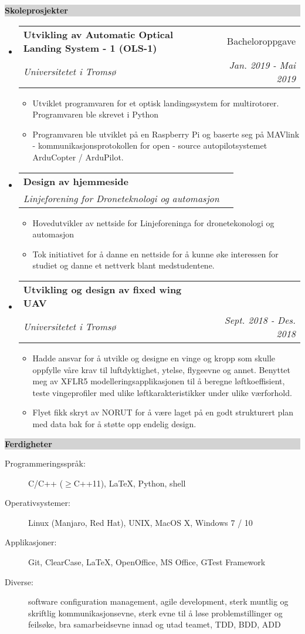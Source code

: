 \documentclass[letterpaper,11pt]{article}
\makeatletter
\newcommand{\mycolorbox}[2]{{\noindent\colorbox{#1}{\begin{minipage}{\linewidth-2\fboxsep}{\textbf{#2}}\end{minipage}}}}
\newcommand{\resitem}[1]{\item #1 \vspace{-2pt}}
\newcommand{\resheading}[1]{{\large \mycolorbox{lightgray}{#1}}}%
\newcommand{\ressubheading}[4]{
\begin{tabular*}{6.5in}{l@{\extracolsep{\fill}}r}
		\textbf{#1} & #2 \\
		\textit{#3} & \textit{#4} \\
\end{tabular*}\vspace{-5pt}}
\makeatother
\begin{document}
\resheading{Skoleprosjekter}
\begin{itemize}
\item
   \ressubheading{Utvikling av Automatic Optical Landing System - 1 (OLS-1)}{Bacheloroppgave}{Universitetet i Tromsø}{Jan. 2019 - Mai 2019}
	\begin{itemize}
           \resitem{Utviklet programvaren for et optisk landingssystem for multirotorer. Programvaren ble skrevet i Python}
           \resitem{Programvaren ble utviklet på en Raspberry Pi og baserte seg på MAVlink - kommunikasjonsprotokollen for open - source autopilotsystemet ArduCopter / ArduPilot.}
	\end{itemize}

\item
	\ressubheading{Design av hjemmeside}{}{Linjeforening for Droneteknologi og automasjon }{}
	\begin{itemize}
           \resitem{Hovedutvikler av nettside for Linjeforeninga for dronetekonologi og automasjon}
           \resitem{Tok initiativet for å danne en nettside for å kunne øke interessen for studiet og danne et nettverk blant medstudentene.}
	\end{itemize}

\item
   \ressubheading{Utvikling og design av fixed wing UAV}{}{Universitetet i Tromsø}{Sept. 2018 - Des. 2018}
	\begin{itemize}
           \resitem{Hadde ansvar for å utvikle og designe en vinge og kropp som skulle oppfylle våre krav til luftdyktighet, ytelse, flygeevne og annet. Benyttet meg av XFLR5 modelleringsapplikasjonen til å beregne løftkoeffisient, teste vingeprofiler med ulike løftkarakteristikker under ulike værforhold.}
           \resitem{Flyet fikk skryt av NORUT for å være laget på en godt strukturert plan med data bak for å støtte opp endelig design.}
	\end{itemize}

\end{itemize}

\resheading{Ferdigheter}

\begin{description}
\item[Programmeringsspråk:]
C/C++ ($\geq$C++11), \LaTeX, Python, shell
\item[Operativsystemer:]
Linux (Manjaro, Red Hat), UNIX, MacOS X, Windows 7 / 10
\item[Applikasjoner:]
Git, ClearCase, \LaTeX, OpenOffice, MS Office, GTest Framework
\item[Diverse:]
software configuration management, agile development, sterk muntlig og skriftlig kommunikasjonsevne, sterk evne til å løse problemstillinger og feilsøke, bra samarbeidsevne innad og utad teamet, TDD, BDD, ADD
\end{description}
\end{document}
